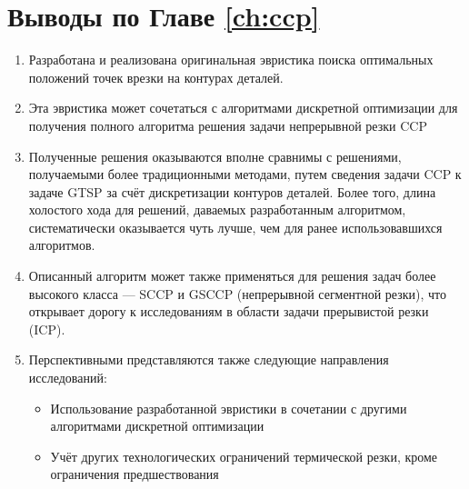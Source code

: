 
\section{Выводы по Главе \ref{ch:ccp}}
\label{sec:ccp.conclude}

\begin{enumerate}
  \item
  Разработана и реализована оригинальная эвристика
  поиска оптимальных положений точек врезки
  на контурах деталей.
  \item
  Эта эвристика может сочетаться с алгоритмами
  дискретной оптимизации для получения
  полного алгоритма решения задачи непрерывной резки
  CCP
  \item
  Полученные решения оказываются вполне сравнимы
  с решениями, получаемыми более традиционными методами,
  путем сведения задачи CCP к задаче GTSP за счёт
  дискретизации контуров деталей.
  Более того, длина холостого хода
  для решений, даваемых разработанным алгоритмом,
  систематически оказывается чуть лучше,
  чем для ранее использовавшихся алгоритмов.
  \item
  Описанный алгоритм может также применяться
  для решения задач более высокого класса ---
  SCCP и GSCCP (непрерывной сегментной резки),
  что открывает дорогу к исследованиям в области
  задачи прерывистой резки (ICP).
  \item
  Перспективными представляются также следующие
  направления исследований:
  \begin{itemize}
    \item
    Использование разработанной эвристики
    в сочетании с другими алгоритмами дискретной оптимизации
    \item
    Учёт других технологических ограничений термической резки,
    кроме ограничения предшествования
  \end{itemize}
\end{enumerate}
